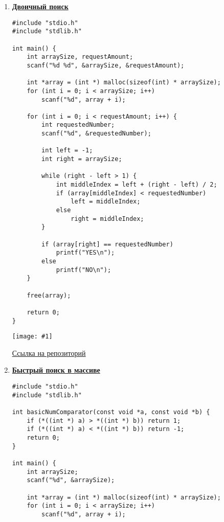 \documentclass[a4paper,14pt]{extarticle}
\newcommand\codeforcesresult[1]{
    \begin{center}
        \texttt{[image: \#1]}
    \end{center}
}
\begin{document}
\begin{enumerate}
    \item \href{https://codeforces.com/edu/course/2/lesson/6/1/practice/contest/283911/problem/A}{\textbf{Двоичный поиск}}
\begin{verbatim}
#include "stdio.h"
#include "stdlib.h"

int main() {
    int arraySize, requestAmount;
    scanf("%d %d", &arraySize, &requestAmount);

    int *array = (int *) malloc(sizeof(int) * arraySize);
    for (int i = 0; i < arraySize; i++)
        scanf("%d", array + i);

    for (int i = 0; i < requestAmount; i++) {
        int requestedNumber;
        scanf("%d", &requestedNumber);

        int left = -1;
        int right = arraySize;

        while (right - left > 1) {
            int middleIndex = left + (right - left) / 2;
            if (array[middleIndex] < requestedNumber)
                left = middleIndex;
            else
                right = middleIndex;
        }

        if (array[right] == requestedNumber)
            printf("YES\n");
        else
            printf("NO\n");
    }

    free(array);

    return 0;
}
\end{verbatim}
\codeforcesresult{/codeforceresults/283911A}
\href{https://github.com/IAmProgrammist/programming-and-algorithmization-basics/blob/c/lab10/1.c}{\underline{Ссылка на репозиторий}}

\newpage
\item \href{https://codeforces.com/edu/course/2/lesson/6/1/practice/contest/283911/problem/D}{\textbf{Быстрый поиск в массиве}}
\begin{verbatim}
#include "stdio.h"
#include "stdlib.h"

int basicNumComparator(const void *a, const void *b) {
    if (*((int *) a) > *((int *) b)) return 1;
    if (*((int *) a) < *((int *) b)) return -1;
    return 0;
}

int main() {
    int arraySize;
    scanf("%d", &arraySize);

    int *array = (int *) malloc(sizeof(int) * arraySize);
    for (int i = 0; i < arraySize; i++)
        scanf("%d", array + i);


\end{verbatim}
\end{enumerate}
\end{document}
